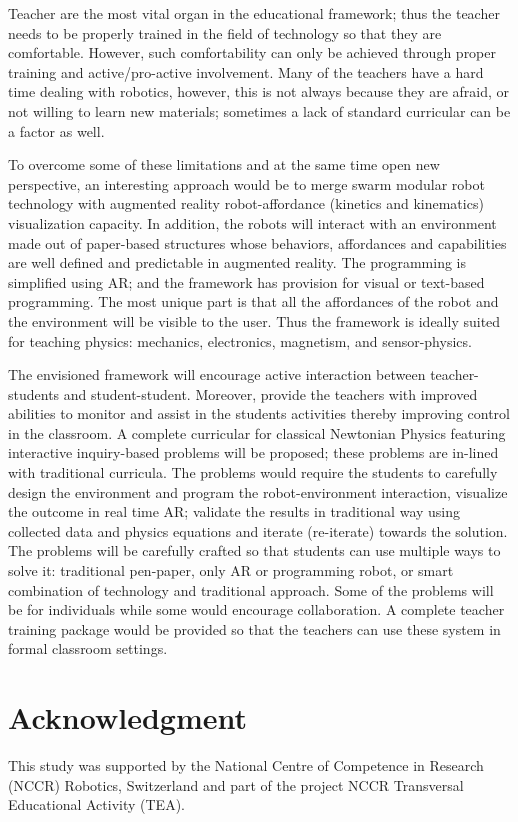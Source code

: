 \documentclass[conference]{IEEEtran}
\begin{document}
Teacher are the most vital organ in the educational framework; thus the teacher needs to be properly trained in the 
field of technology so that they are comfortable. However, such comfortability can only be achieved 
through proper training and active/pro-active involvement. Many of the teachers have a hard time dealing with robotics, 
however, this is not always because they are afraid, or not willing to learn new materials; sometimes a lack of standard 
curricular can be a factor as well. 

To overcome some of these limitations and at the same time open new perspective, an interesting approach would be to 
merge swarm modular robot technology with augmented reality robot-affordance (kinetics and kinematics) visualization 
capacity. In addition, the robots will interact with an environment made out of paper-based structures whose behaviors, 
affordances and capabilities are well defined and predictable in augmented reality. The programming is simplified using 
AR; and the framework has provision for visual or text-based programming. The most unique part is that all the 
affordances of the robot and the environment will be visible to the user. Thus the framework is ideally suited for 
teaching physics: mechanics, electronics, magnetism, and sensor-physics. 

The envisioned framework will encourage active interaction between teacher-students and student-student. Moreover, 
provide the teachers with improved abilities to monitor and assist in the students activities thereby improving control 
in the classroom. A complete curricular for classical Newtonian Physics featuring interactive inquiry-based problems 
will be proposed; these problems are in-lined with traditional curricula. The problems would require the students to 
carefully design the environment and program the robot-environment interaction, visualize the outcome in real time 
AR; validate the results in traditional way using collected data and physics equations and iterate 
(re-iterate) towards the solution. The problems will be carefully crafted so that students can use multiple ways to 
solve it: traditional pen-paper, only AR or programming robot, or smart combination of technology and traditional 
approach. Some of the problems will be for individuals while some would encourage collaboration. A complete 
teacher training package would be provided so that the teachers can use these system in formal classroom settings.


\section*{Acknowledgment}

This study was supported by the National Centre of Competence in Research (NCCR) Robotics, Switzerland and part of the 
project NCCR Transversal Educational Activity (TEA).


\end{document}
